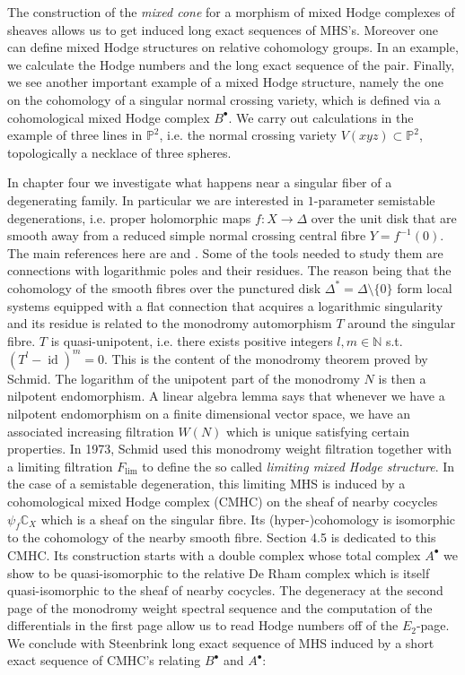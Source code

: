 \documentclass{article}
\newcommand{\CC}{\mathbb{C}}
\newcommand{\NN}{\mathbb{N}}
\newcommand{\PP}{\mathbb{P}}
\newcommand {\id}  {\operatorname{id}}
\numberwithin{equation}{section}
\begin{document}
The construction of the \emph{mixed cone} for a morphism of mixed Hodge complexes of sheaves allows us to get induced long exact sequences of MHS's. Moreover one can define mixed Hodge structures on relative cohomology groups. In an example, we calculate the Hodge numbers and the long exact sequence of the pair. Finally, we see another important example of a mixed Hodge structure, namely the one on the cohomology of a singular normal crossing variety, which is defined via a cohomological mixed Hodge complex $B^\bullet$. We carry out calculations in the example of three lines in $\PP^2$, i.e. the normal crossing variety $V(xyz) \subset \PP^2$, topologically a necklace of three spheres.

%
%

In chapter four we investigate what happens near a singular fiber of a degenerating family. In particular we are interested in $1$-parameter semistable degenerations, i.e. proper holomorphic maps $f \colon X \to \Delta$ over the unit disk that are smooth away from a reduced simple normal crossing central fibre $Y = f^{-1}(0)$. The main references here are \cite{Sc73} and \cite{PS08}.
Some of the tools needed to study them are connections with logarithmic poles and their residues. The reason being that the cohomology of the smooth fibres over the punctured disk $\Delta^* = \Delta \setminus \{0 \}$ form local systems equipped with a flat connection that acquires a logarithmic singularity and its residue is related to the monodromy automorphism $T$ around the singular fibre. $T$ is quasi-unipotent, i.e. there exists positive integers $l,m \in \NN$ s.t. $(T^l - \id)^{m}=0$. This is the content of the monodromy theorem proved by Schmid. The logarithm of the unipotent part of the monodromy $N$ is then a nilpotent endomorphism. A linear algebra lemma says that whenever we have a nilpotent endomorphism on a finite dimensional vector space, we have an associated increasing filtration $W(N)$ which is unique satisfying certain properties. In 1973, Schmid used this monodromy weight filtration together with a limiting filtration $F_{\lim}$ to define the so called \emph{limiting mixed Hodge structure}. In the case of a semistable degeneration, this limiting MHS is induced by a cohomological mixed Hodge complex (CMHC) on the sheaf of nearby cocycles $\psi_f \CC_X$ which is a sheaf on the singular fibre. Its (hyper-)cohomology is isomorphic to the cohomology of the nearby smooth fibre. Section 4.5 %
is dedicated to this CMHC. Its construction starts with a double complex whose total complex $A^\bullet$ we show to be quasi-isomorphic to the relative De Rham complex which is itself quasi-isomorphic to the sheaf of nearby cocycles. The degeneracy at the second page of the monodromy weight spectral sequence and the computation of the differentials in the first page allow us to read Hodge numbers off of the $E_2$-page. We conclude with Steenbrink long exact sequence of MHS induced by a short exact sequence of CMHC's relating $B^\bullet$ and $A^\bullet$:
\end{document}
